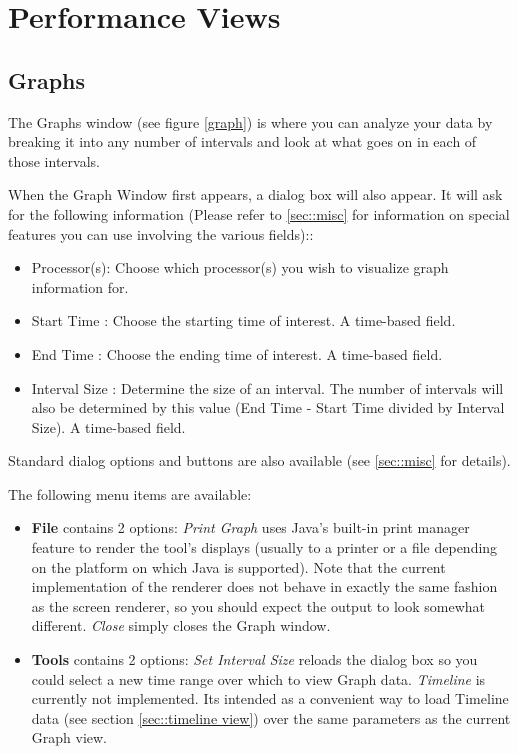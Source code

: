 \documentclass[10pt]{report}
\begin{document}
\section{Performance Views}

\subsection{Graphs}
\label{sec::graph view}


The Graphs window (see figure \ref{graph}) is where you can analyze your data by breaking it
into any number of intervals and look at what goes on in each of those
intervals.


When the Graph Window first appears, a dialog box will also appear. It
will ask for the following information (Please refer to
\ref{sec::misc} for information on special features you can
use involving the various fields)::

\begin{itemize}
\item
Processor(s): Choose which processor(s) you wish to visualize graph 
information for.
\item
Start Time : Choose the starting time of interest. A time-based field.
\item
End Time : Choose the ending time of interest. A time-based field.
\item
Interval Size : Determine the size of an interval. The number of intervals
will also be determined by this value (End Time - Start Time divided by
Interval Size). A time-based field.
\end{itemize}

Standard \projections{} dialog options and buttons are also available
(see \ref{sec::misc} for details).

The following menu items are available:

\begin{itemize}
\item
{\bf File} contains 2 options: {\it Print Graph} uses Java's built-in 
print manager feature to render the tool's displays (usually to a printer 
or a file depending on the platform on which Java is supported). Note that
the current implementation of the renderer does not behave in exactly the
same fashion as the screen renderer, so you should expect the output to look
somewhat different. {\it Close} simply closes the Graph window.
\item
{\bf Tools} contains 2 options: {\it Set Interval Size} reloads the dialog
box so you could select a new time range over which to view Graph data.
{\it Timeline} is currently not implemented. Its intended as a convenient
way to load Timeline data (see section \ref{sec::timeline view}) over the 
same parameters as the current Graph view.
\end{itemize}
\end{document}
